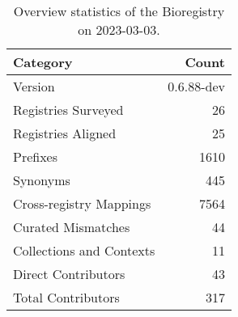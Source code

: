 \begin{table}
\centering
\caption{Overview statistics of the Bioregistry on 2023-03-03.}
\label{tab:bioregistry-summary}
\begin{tabular}{lr}
\toprule
                Category &      Count \\
\midrule
                 Version & 0.6.88-dev \\
     Registries Surveyed &         26 \\
      Registries Aligned &         25 \\
                Prefixes &       1610 \\
                Synonyms &        445 \\
 Cross-registry Mappings &       7564 \\
      Curated Mismatches &         44 \\
Collections and Contexts &         11 \\
     Direct Contributors &         43 \\
      Total Contributors &        317 \\
\bottomrule
\end{tabular}
\end{table}
